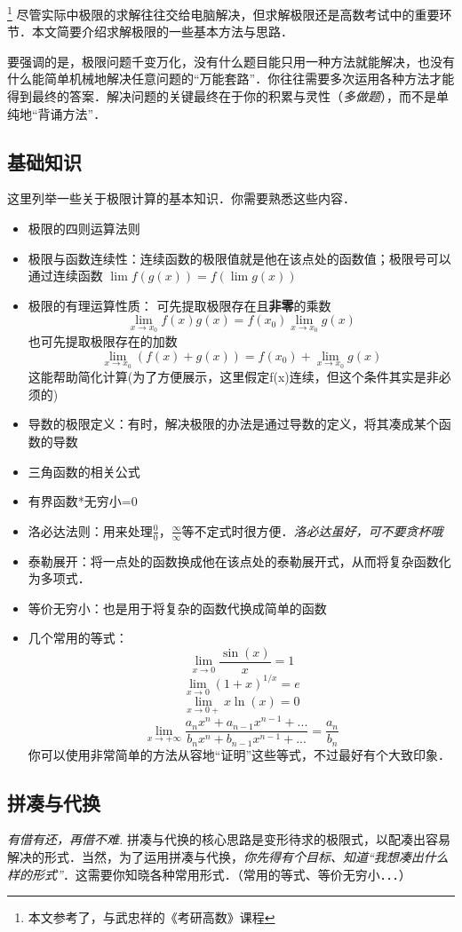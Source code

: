 
\begin{issues}
\issueDraft
\end{issues}
\footnote{本文参考了\cite{同济高}，\cite{Thomas}与武忠祥的《考研高数》课程}
尽管实际中极限的求解往往交给电脑解决，但求解极限还是高数考试中的重要环节．本文简要介绍求解极限的一些基本方法与思路．

要强调的是，极限问题千变万化，没有什么题目能只用一种方法就能解决，也没有什么能简单机械地解决任意问题的“万能套路”．你往往需要多次运用各种方法才能得到最终的答案．解决问题的关键最终在于你的积累与灵性（\textsl{多做题}），而不是单纯地“背诵方法”．

\subsection{基础知识}
这里列举一些关于极限计算的基本知识．你需要熟悉这些内容．
\begin{itemize}
\item 极限的四则运算法则
\item 极限与函数连续性：连续函数的极限值就是他在该点处的函数值；极限号可以通过连续函数 $\lim f(g(x)) = f(\lim g(x))$
\item 极限的有理运算性质：
可先提取极限存在且\textbf{非零}的乘数 
$$\lim_{x\to x_0} f(x)g(x) = f(x_0)\lim_{x\to x_0} g(x)$$
也可先提取极限存在的加数
$$\lim_{x\to x_0} (f(x)+g(x)) = f(x_0)+\lim_{x\to x_0} g(x)$$
这能帮助简化计算(为了方便展示，这里假定f(x)连续，但这个条件其实是非必须的)
\item 导数的极限定义：有时，解决极限的办法是通过导数的定义，将其凑成某个函数的导数
\item 三角函数的相关公式
\item 有界函数*无穷小=0
\item 洛必达法则：用来处理$\frac{0}{0}$，$\frac{\infty}{\infty}$等不定式时很方便．\textsl{洛必达虽好，可不要贪杯哦}
\item 泰勒展开：将一点处的函数换成他在该点处的泰勒展开式，从而将复杂函数化为多项式．
\item 等价无穷小：也是用于将复杂的函数代换成简单的函数
\item 几个常用的等式：
$$\lim_{x\to0} \frac{\sin(x)}{x}=1$$
$$\lim_{x\to0} (1+x)^{1/x}=e$$
$$\lim_{x\to0+} x\ln(x)=0$$
$$\lim_{x\to+\infty} \frac{a_nx^n+a_{n-1}x^{n-1}+...}{b_nx^n+b_{n-1}x^{n-1}+...}=\frac{a_n}{b_n}$$
你可以使用非常简单的方法从容地“证明”这些等式，不过最好有个大致印象．
\end{itemize}

\subsection{拼凑与代换}
\textsl{有借有还，再借不难.} 拼凑与代换的核心思路是变形待求的极限式，以配凑出容易解决的形式．当然，为了运用拼凑与代换，\textsl{你先得有个目标、知道“我想凑出什么样的形式”}．这需要你知晓各种常用形式．（常用的等式、等价无穷小．．．）

